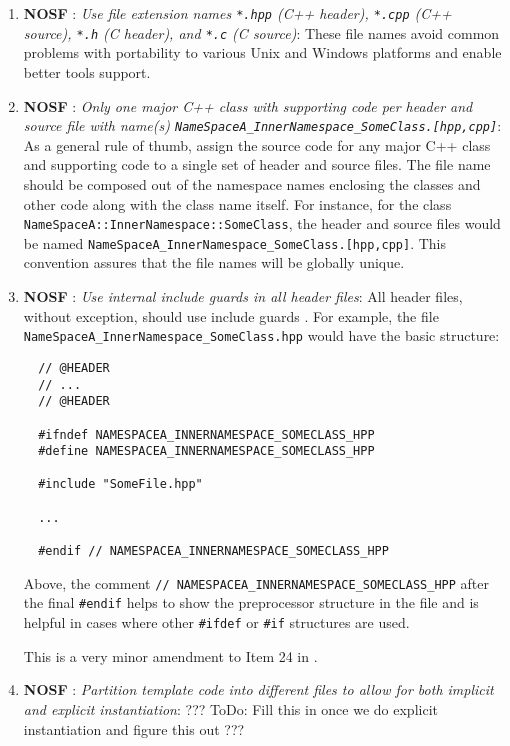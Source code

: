 \begin{enumerate}

{}\item{}\textbf{NOSF
{}}: {}\textit{Use file extension names
{}\texttt{*.hpp} (C++ header), {}\texttt{*.cpp} (C++ source), {}\texttt{*.h}
(C header), and {}\texttt{*.c} (C source)}: These file names avoid common
problems with portability to various Unix and Windows platforms and enable
better tools support.

{}\item{}\textbf{NOSF
}: {} {}\textit{Only one major C++ class with
supporting code per header and source file with name(s)
{}\texttt{NameSpaceA\-\_InnerNamespace\-\_SomeClass.[hpp,cpp]}}: As a general
rule of thumb, assign the source code for any major C++ class and supporting
code to a single set of header and source files.  The file name should be
composed out of the namespace names enclosing the classes and other code along
with the class name itself.  For instance, for the class
{}\texttt{NameSpaceA\-::InnerNamespace\-::SomeClass}, the header and source
files would be named
{}\texttt{NameSpaceA\-\_InnerNamespace\-\_SomeClass.[hpp,cpp]}.  This
convention assures that the file names will be globally unique.

{}\item{}\textbf{NOSF }: {}
{}\textit{Use internal include guards in all header files}: All header
files, without exception, should use include guards {}\cite[Item
24]{C++CodingStandards05}.  For example, the file
{}\texttt{NameSpaceA\-\_InnerNamespace\-\_SomeClass.hpp} would have the basic
structure:

{\small\begin{verbatim}
  // @HEADER
  // ...
  // @HEADER

  #ifndef NAMESPACEA_INNERNAMESPACE_SOMECLASS_HPP
  #define NAMESPACEA_INNERNAMESPACE_SOMECLASS_HPP

  #include "SomeFile.hpp"

  ...

  #endif // NAMESPACEA_INNERNAMESPACE_SOMECLASS_HPP
\end{verbatim}}

Above, the comment {}\texttt{//
NAMESPACEA\-\_INNERNAMESPACE\-\_SOMECLASS\-\_HPP} after the final
{}\texttt{\#endif} helps to show the preprocessor structure in the file and is
helpful in cases where other {}\texttt{\#ifdef} or {}\texttt{\#if} structures
are used.

This is a very minor amendment to Item 24 in {}\cite{C++CodingStandards05}.

{}\item{}\textbf{NOSF }: {}
{}\textit{Partition template code into different files to allow for both
implicit and explicit instantiation}: ??? ToDo: Fill this in once we do
explicit instantiation and figure this out ???

\end{enumerate}

